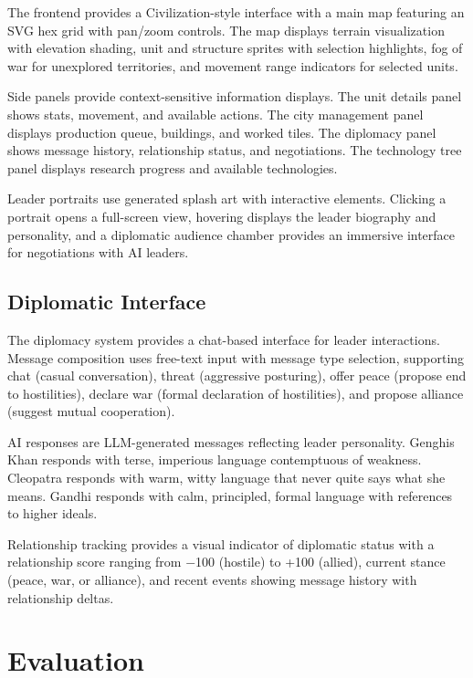 \documentclass[conference]{IEEEtran}
\begin{document}
The frontend provides a Civilization-style interface with a main map featuring an SVG hex grid with pan/zoom controls. The map displays terrain visualization with elevation shading, unit and structure sprites with selection highlights, fog of war for unexplored territories, and movement range indicators for selected units.

Side panels provide context-sensitive information displays. The unit details panel shows stats, movement, and available actions. The city management panel displays production queue, buildings, and worked tiles. The diplomacy panel shows message history, relationship status, and negotiations. The technology tree panel displays research progress and available technologies.

Leader portraits use generated splash art with interactive elements. Clicking a portrait opens a full-screen view, hovering displays the leader biography and personality, and a diplomatic audience chamber provides an immersive interface for negotiations with AI leaders.

\subsection{Diplomatic Interface}

The diplomacy system provides a chat-based interface for leader interactions. Message composition uses free-text input with message type selection, supporting chat (casual conversation), threat (aggressive posturing), offer peace (propose end to hostilities), declare war (formal declaration of hostilities), and propose alliance (suggest mutual cooperation).

AI responses are LLM-generated messages reflecting leader personality. Genghis Khan responds with terse, imperious language contemptuous of weakness. Cleopatra responds with warm, witty language that never quite says what she means. Gandhi responds with calm, principled, formal language with references to higher ideals.

Relationship tracking provides a visual indicator of diplomatic status with a relationship score ranging from $-$100 (hostile) to +100 (allied), current stance (peace, war, or alliance), and recent events showing message history with relationship deltas.

\section{Evaluation}
\label{sec:evaluation}
\end{document}
